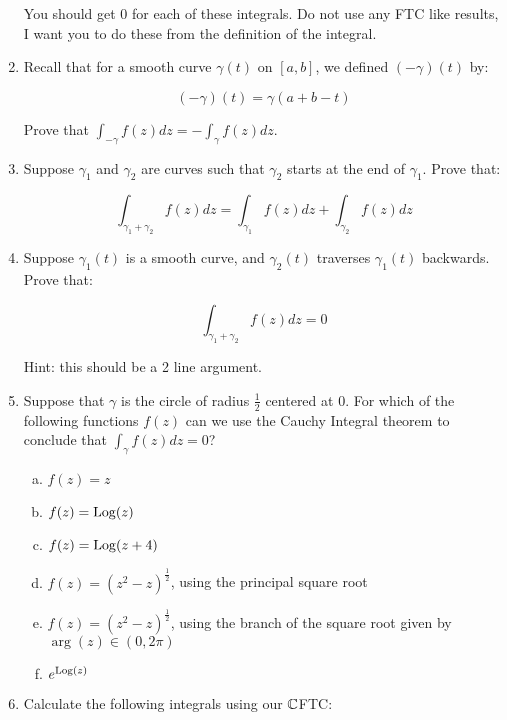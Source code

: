 \begin{enumerate}
You should get $0$ for each of these integrals. Do not use any FTC like results, I want you to do these from the definition of the integral.


\item Recall that for a smooth curve $\gamma(t)$ on $[a,b]$, we defined $(-\gamma)(t)$ by:

$$(-\gamma)(t) = \gamma(a + b - t)$$

Prove that $\int_{-\gamma}f(z)dz = -\int_\gamma f(z)dz$.

\item Suppose $\gamma_1$ and $\gamma_2$ are curves such that $\gamma_2$ starts at the end of $\gamma_1$. Prove that:

$$\int_{\gamma_1 + \gamma_2} f(z)dz = \int_{\gamma_1}f(z)dz + \int_{\gamma_2}f(z)dz$$

\item Suppose $\gamma_1(t)$ is a smooth curve, and $\gamma_2(t)$ traverses $\gamma_1(t)$ backwards. Prove that:

$$\int_{\gamma_1 + \gamma_2} f(z)dz = 0$$

Hint: this should be a 2 line argument.


\item Suppose that $\gamma$ is the circle of radius $\frac{1}{2}$ centered at $0$. For which of the following functions $f(z)$ can we use the Cauchy Integral theorem to conclude that $\int_{\gamma}f(z)dz = 0$?

\begin{enumerate}[a)]
\item $f(z) = z$
\item $f(z) = \mathrm{Log}(z)$
\item $f(z) = \mathrm{Log}(z + 4)$
\item $f(z) = (z^2 - z)^{\frac{1}{2}}$, using the principal square root
\item $f(z) = (z^2 - z)^{\frac{1}{2}}$, using the branch of the square root given by $\arg(z) \in (0,2\pi)$
\item $e^{\mathrm{Log}(z)}$
\end{enumerate}


\item Calculate the following integrals using our $\mathbb{C}$FTC:


\end{enumerate}

